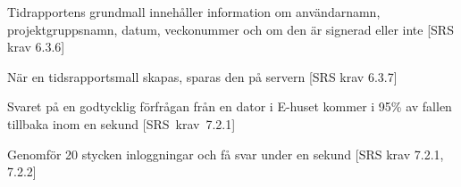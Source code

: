 \documentclass[a4paper]{article}
\begin{document}
\begin{appendices}
\begin{ST}
\item
Tidrapportens grundmall innehåller information om användarnamn, projektgruppsnamn, datum, veckonummer och om den är signerad eller inte [SRS krav 6.3.6]

\item
När en tidsrapportsmall skapas, sparas den på servern [SRS krav 6.3.7]



\item
Svaret på en godtycklig förfrågan från en dator i E-huset kommer i 95\% av fallen tillbaka inom en sekund [SRS~krav~7.2.1]

\item
Genomför 20 stycken inloggningar och få svar under en sekund [SRS krav 7.2.1, 7.2.2]


\end{ST}




\end{appendices}

\newpage
\end{document}
